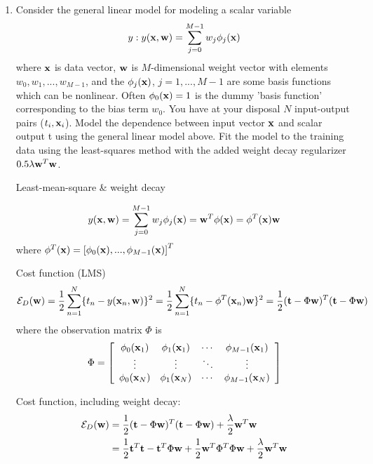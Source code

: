\begin{enumerate}
\item Consider the general linear model for modeling a scalar
  variable \[y: y({\bf x},{\bf w}) = \sum_{j=0}^{M-1} w_j \phi_j({\bf
    x})\] where ${\bf x}$ is data vector, ${\bf w}$ is $M$-dimensional
  weight vector with elements $w_0,w_1,...,w_{M-1}$, and the
  $\phi_j({\bf x})$, $j=1,...,M-1$ are some basis functions which can
  be nonlinear. Often $\phi_0({\bf x}) = 1$ is the dummy 'basis
  function' corresponding to the bias term $w_0$.  You have at your
  disposal $N$ input-output pairs ($t_i,{\bf x}_i$). Model the
  dependence between input vector ${\bf x}$ and scalar output t using
  the general linear model above. Fit the model to the training data
  using the least-squares method with the added weight decay
  regularizer $0.5\lambda {\bf w}^T{\bf w}$.

  \begin{solution}

    Least-mean-square \& weight decay

    \[
    y({\bf{x}},{\bf{w}})=\sum_{j=0}^{M-1} w_j \phi_j({\bf{x}}) = {\bf{w}}^T \phi({\bf{x}}) = \phi^T({\bf{x}}){\bf{w}}
    \]
    where $\phi^T({\bf{x}}) = \left[ \phi_0({\bf{x}}), ..., \phi_{M-1}({\bf{x}})  \right]^T$

    Cost function (LMS)
    \[
    \mathcal{E}_D({\bf{w}}) = \frac{1}{2}\sum_{n=1}^{N} \lbrace t_n -
    y({\bf{x}}_n,{\bf{w}}) \rbrace^2
    =\frac{1}{2}\sum_{n=1}^{N} \lbrace t_n - \phi^T({\bf{x}}_n){\bf{w}} \rbrace^2
    =\frac{1}{2} ({\bf{t}}-\Phi {\bf{w}})^T({\bf{t}}-\Phi {\bf{w}})
    \]
    where the observation matrix $\Phi$ is
    \begin{equation*}
      \Phi =
      \left[
        \begin{array}{cccc}
          \phi_0({\bf{x}}_1) & \phi_1({\bf{x}}_1) & \cdots & \phi_{M-1}({\bf{x}}_1) \\
          \vdots             & \vdots             & \ddots & \vdots  \\
          \phi_0({\bf{x}}_N) & \phi_1({\bf{x}}_N) & \cdots & \phi_{M-1}({\bf{x}}_N) \\
        \end{array}
      \right]
    \end{equation*}

    Cost function, including weight decay:
    \[
    \begin{split}
      \mathcal{E}_D({\bf{w}}) &= \frac{1}{2} ({\bf{t}}-\Phi {\bf{w}})^T({\bf{t}}-\Phi
      {\bf{w}}) + \frac{\lambda}{2} {\bf{w}}^T{\bf{w}}\\
      &=\frac{1}{2}{\bf{t}}^T{\bf{t}} - {\bf{t}}^T\Phi {\bf{w}} + \frac{1}{2}{\bf{w}}^T\Phi^T \Phi
      {\bf{w}} +\frac{\lambda}{2}{\bf{w}}^T{\bf{w}}
    \end{split}
    \]


\end{solution}
\end{enumerate}
